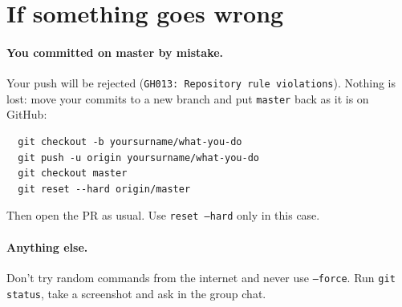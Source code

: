 \documentclass[11pt, a4paper]{article}
\begin{document}
\section{If something goes wrong}
 
\paragraph{You committed on master by mistake.} Your push will be rejected (\texttt{GH013: Repository rule violations}). Nothing is lost: move your commits to a new branch and put \texttt{master} back as it is on GitHub:
\begin{verbatim}
  git checkout -b yoursurname/what-you-do
  git push -u origin yoursurname/what-you-do
  git checkout master
  git reset --hard origin/master
\end{verbatim}
Then open the PR as usual. Use \texttt{reset --hard} only in this case.
 
\paragraph{Anything else.} Don't try random commands from the internet and never use \texttt{--force}. Run \texttt{git status}, take a screenshot and ask in the group chat.
\end{document}

